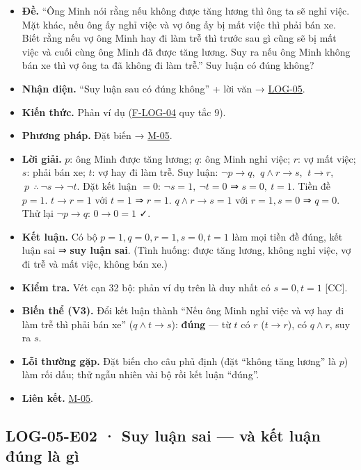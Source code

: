 \documentclass[
  10pt,
  twoside,openany]{book}
\providecommand{\tightlist}{%
  \setlength{\itemsep}{0pt}\setlength{\parskip}{0pt}}
\begin{document}
\begin{itemize}
\tightlist
\item
  \textbf{Đề.} ``Ông Minh nói rằng nếu không được tăng lương thì ông ta
  sẽ nghỉ việc. Mặt khác, nếu ông ấy nghỉ việc và vợ ông ấy bị mất việc
  thì phải bán xe. Biết rằng nếu vợ ông Minh hay đi làm trễ thì trước
  sau gì cũng sẽ bị mất việc và cuối cùng ông Minh đã được tăng lương.
  Suy ra nếu ông Minh không bán xe thì vợ ông ta đã không đi làm trễ.''
  Suy luận có đúng không?
\item
  \textbf{Nhận diện.} ``Suy luận sau có đúng không'' + lời văn →
  \protect\hyperlink{LOG-05}{LOG-05}.
\item
  \textbf{Kiến thức.} Phản ví dụ (\protect\hyperlink{F-LOG-04}{F-LOG-04}
  quy tắc 9).
\item
  \textbf{Phương pháp.} Đặt biến → \protect\hyperlink{M-05}{M-05}.
\item
  \textbf{Lời giải.} \(p\): ông Minh được tăng lương; \(q\): ông Minh
  nghỉ việc; \(r\): vợ mất việc; \(s\): phải bán xe; \(t\): vợ hay đi
  làm trễ. Suy luận: \(\neg p\to q\), \(\ q\wedge r\to s\),
  \(\ t\to r\), \(\ p\ \ \therefore\ \neg s\to\neg t\). Đặt kết luận
  \(=0\): \(\neg s=1,\ \neg t=0\) ⇒ \(s=0,\ t=1\). Tiền đề \(p=1\).
  \(t\to r=1\) với \(t=1\) ⇒ \(r=1\). \(q\wedge r\to s=1\) với
  \(r=1,s=0\) ⇒ \(q=0\). Thử lại \(\neg p\to q\): \(0\to0=1\) ✓.
\item
  \textbf{Kết luận.} Có bộ \(p=1,q=0,r=1,s=0,t=1\) làm mọi tiền đề đúng,
  kết luận sai ⇒ \textbf{suy luận sai}. (Tình huống: được tăng lương,
  không nghỉ việc, vợ đi trễ và mất việc, không bán xe.)
\item
  \textbf{Kiểm tra.} Vét cạn 32 bộ: phản ví dụ trên là duy nhất có
  \(s=0,t=1\) {[}CC{]}.
\item
  \textbf{Biến thể (V3).} Đổi kết luận thành ``Nếu ông Minh nghỉ việc và
  vợ hay đi làm trễ thì phải bán xe'' (\(q\wedge t\to s\)):
  \textbf{đúng} --- từ \(t\) có \(r\) (\(t\to r\)), có \(q\wedge r\),
  suy ra \(s\).
\item
  \textbf{Lỗi thường gặp.} Đặt biến cho câu phủ định (đặt ``không tăng
  lương'' là \(p\)) làm rối dấu; thử ngẫu nhiên vài bộ rồi kết luận
  ``đúng''.
\item
  \textbf{Liên kết.} \protect\hyperlink{M-05}{M-05}.
\end{itemize}

\hypertarget{LOG-05-E02}{%
\subsection{LOG-05-E02 · Suy luận sai --- và kết luận đúng là
gì}\label{LOG-05-E02}}
\end{document}
